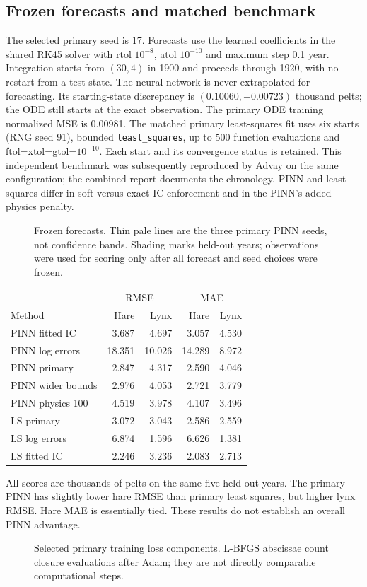 \subsection{Frozen forecasts and matched benchmark}
The selected primary seed is 17. Forecasts use the learned coefficients in the shared
RK45 solver with rtol $10^{-8}$, atol $10^{-10}$ and maximum step 0.1 year. Integration
starts from $(30,4)$ in 1900 and proceeds through 1920, with no restart from a test state.
The neural network is never extrapolated for forecasting. Its starting-state discrepancy
is $(0.10060,-0.00723)$ thousand pelts; the ODE still starts at the exact observation.
The primary ODE training normalized MSE is 0.00981. The matched primary least-squares
fit uses six starts (RNG seed 91), bounded \texttt{least\_squares}, up to 500 function
evaluations and ftol=xtol=gtol=$10^{-10}$. Each start and its convergence status is retained.
This independent benchmark was subsequently reproduced by Advay on the same configuration; the combined report documents the chronology. PINN and least squares differ in soft versus
exact IC enforcement and in the PINN's added physics penalty.
\begin{figure}[htbp]\centering
{}
\caption{Frozen forecasts. Thin pale lines are the three primary PINN seeds, not confidence
bands. Shading marks held-out years; observations were used for scoring only after all
forecast and seed choices were frozen.}
\end{figure}
\begin{center}\small\begin{tabular}{lrrrr}\toprule
& \multicolumn{2}{c}{RMSE} & \multicolumn{2}{c}{MAE}\\
Method & Hare & Lynx & Hare & Lynx\\\midrule
PINN fitted IC & 3.687 & 4.697 & 3.057 & 4.530 \\
PINN log errors & 18.351 & 10.026 & 14.289 & 8.972 \\
PINN primary & 2.847 & 4.317 & 2.590 & 4.046 \\
PINN wider bounds & 2.976 & 4.053 & 2.721 & 3.779 \\
PINN physics 100 & 4.519 & 3.978 & 4.107 & 3.496 \\
LS primary & 3.072 & 3.043 & 2.586 & 2.559 \\
LS log errors & 6.874 & 1.596 & 6.626 & 1.381 \\
LS fitted IC & 2.246 & 3.236 & 2.083 & 2.713 \\
\bottomrule\end{tabular}\end{center}
All scores are thousands of pelts on the same five held-out years. The primary PINN has
slightly lower hare RMSE than primary least squares, but higher lynx RMSE. Hare MAE is
essentially tied. These results do not establish an overall PINN advantage.
\begin{figure}[htbp]\centering
{}
\caption{Selected primary training loss components. L-BFGS abscissae count closure
evaluations after Adam; they are not directly comparable computational steps.}
\end{figure}

